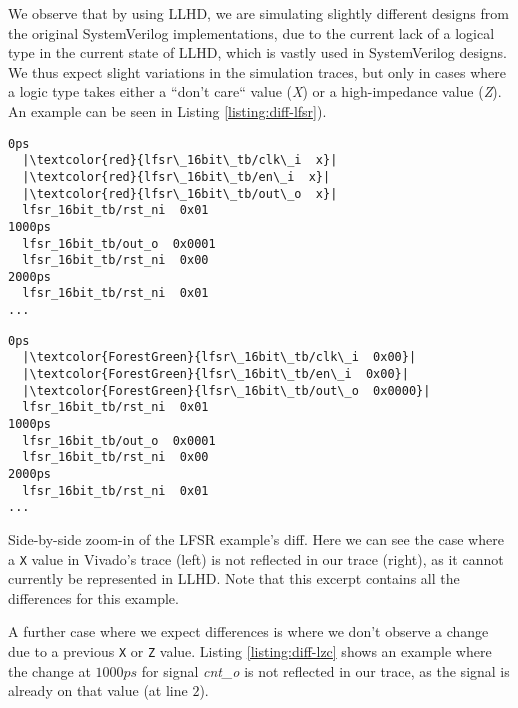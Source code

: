We observe that by using LLHD, we are simulating slightly different designs from the original SystemVerilog implementations, due to the current lack of a logical type in the current state of LLHD, which is vastly used in SystemVerilog designs. We thus expect slight variations in the simulation traces, but only in cases where a logic type takes either a “don't care“ value (\textit{X}) or a high-impedance value (\textit{Z}). An example can be seen in Listing \ref{listing:diff-lfsr}).

\begin{listing}[ht]
    \lstset{
        escapeinside=||,
        basicstyle=\footnotesize\ttfamily,
        stepnumber=1
    }
    \begin{minipage}{0.45\textwidth}
        \begin{lstlisting}
0ps
  |\textcolor{red}{lfsr\_16bit\_tb/clk\_i  x}|
  |\textcolor{red}{lfsr\_16bit\_tb/en\_i  x}|
  |\textcolor{red}{lfsr\_16bit\_tb/out\_o  x}|
  lfsr_16bit_tb/rst_ni  0x01
1000ps
  lfsr_16bit_tb/out_o  0x0001
  lfsr_16bit_tb/rst_ni  0x00
2000ps
  lfsr_16bit_tb/rst_ni  0x01
...
        \end{lstlisting}
    \end{minipage}
    \hfill
    \begin{minipage}{0.45\textwidth}
        \begin{lstlisting}
0ps
  |\textcolor{ForestGreen}{lfsr\_16bit\_tb/clk\_i  0x00}|
  |\textcolor{ForestGreen}{lfsr\_16bit\_tb/en\_i  0x00}|
  |\textcolor{ForestGreen}{lfsr\_16bit\_tb/out\_o  0x0000}|
  lfsr_16bit_tb/rst_ni  0x01
1000ps
  lfsr_16bit_tb/out_o  0x0001
  lfsr_16bit_tb/rst_ni  0x00
2000ps
  lfsr_16bit_tb/rst_ni  0x01
...
        \end{lstlisting}
    \end{minipage}
    \caption[Side-by-side zoom-in of the LFSR example's diff.]{Side-by-side zoom-in of the LFSR example's diff. Here we can see the case where a \texttt{X} value in Vivado's trace (left) is not reflected in our trace (right), as it cannot currently be represented in LLHD. Note that this excerpt contains all the differences for this example.}
    \label{listing:diff-lfsr}
\end{listing}

A further case where we expect differences is where we don't observe a change due to a previous \texttt{X} or \texttt{Z} value. Listing \ref{listing:diff-lzc} shows an example where the change at $1000ps$ for signal \textit{cnt\_o} is not reflected in our trace, as the signal is already on that value (at line $2$).


